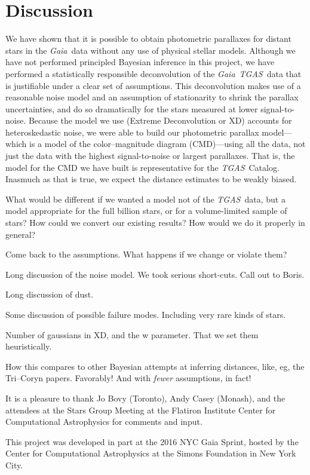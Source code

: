\documentclass[12pt, preprint]{aastex6}
\newcommand{\acronym}[1]{{\small{#1}}}
\newcommand{\project}[1]{\textsl{#1}}
\newcommand{\tgas}{\project{\acronym{TGAS}}}
\newcommand{\gaia}{\project{Gaia}}
\begin{document}
\section{Discussion}

We have shown that it is possible to obtain photometric parallaxes for
distant stars in the \gaia\ data without any use of physical stellar
models.
Although we have not performed principled Bayesian inference in this
project, we have performed a statistically responsible deconvolution
of the \gaia\ \tgas\ data that is justifiable under a clear set of
assumptions.
This deconvolution makes use of a reasonable noise model and an
assumption of stationarity to shrink the parallax uncertainties, and
do so dramatically for the stars measured at lower signal-to-noise.
Because the model we use (Extreme Deconvolution or XD) accounts for
heteroskedastic noise, we were able to build our photometric parallax
model---which is a model of the color--magnitude diagram (CMD)---using
all the data, not just the data with the highest signal-to-noise or
largest parallaxes.
That is, the model for the CMD we have built is representative for
the \tgas\ Catalog.
Inasmuch as that is true, we expect the distance estimates to be
weakly biased.

What would be different if we wanted a model not of the \tgas\ data,
but a model appropriate for the full billion stars, or for a
volume-limited sample of stars?
How could we convert our existing results?
How would we do it properly in general?

Come back to the assumptions. What happens if we change or violate them?

Long discussion of the noise model. We took serious short-cuts. Call out to Boris.

Long discussion of dust.

Some discussion of possible failure modes. Including very rare kinds of stars.

Number of gaussians in XD, and the w parameter. That we set them heuristically.

How this compares to other Bayesian attempts at inferring distances,
like, eg, the Tri--Coryn papers. Favorably! And with \emph{fewer}
assumptions, in fact!

\acknowledgments It is a pleasure to thank
  Jo Bovy (Toronto),
  Andy Casey (Monash),
and the attendees at the Stars Group Meeting at the Flatiron Institute
Center for Computational Astrophysics for comments and input.

This project was developed in part at the 2016 \acronym{NYC} Gaia Sprint, hosted
by the Center for Computational Astrophysics at the Simons Foundation
in New York City.
\end{document}
